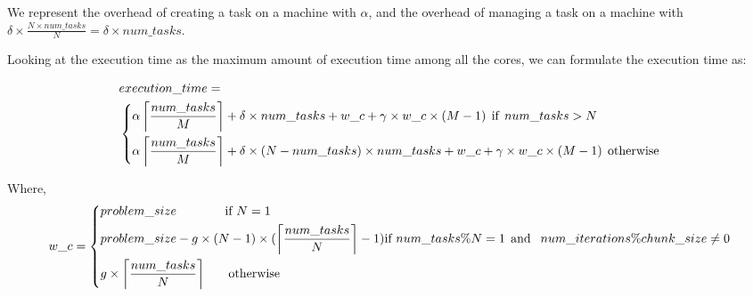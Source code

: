 We represent the overhead of creating a task on a machine with $\alpha$, and the overhead of managing a task on a machine with $\delta\times\frac{{N}\times{num\_{tasks}}}{N}=\delta\times{num\_{tasks}}$. 

Looking at the execution time as the maximum amount of execution time among all the cores, we can formulate the execution time as:  

\begin{equation}\label{formula1}
\begin{aligned}
&execution\_time = \\
&\left\{
\begin{aligned}
&
\alpha\left\lceil{\frac{num\_{tasks}}{M}}\right \rceil +\delta\times{num\_{tasks}}+{w\_c+\gamma\times{w\_c}\times{(M-1)}} \:\: \text{if\:\:}num\_{tasks}>N\\
&\alpha\left \lceil{\frac{num\_{tasks}}{M}}\right \rceil +\delta\times{(N-num\_{tasks})}\times{num\_{tasks}}+{w\_c+\gamma\times{w\_c}\times{(M-1)}} \:\: \text{otherwise}
\end{aligned}
\right.
\end{aligned}
\end{equation}


Where, 
\begin{equation}\label{formula2}
w\_c =\left\{
\begin{aligned}
&problem\_{size} \:\:\:\:\:\:\:\:\:\:\:\:\:\:\:\:        \text{ if } N=1\\
&problem\_{size}-g\times{(N-1)}\times(\left \lceil{\frac{num\_{tasks}}{N}}\right \rceil-1)
 \text{if }num\_{tasks}\%N=1\text{\:\:and\:\: }num\_{iterations}\%chunk\_{size}\neq0\\ 
&g\times\left \lceil{\frac{num\_{tasks}}{N}}\right \rceil  \:\:\:\:\:\:\:\:       \text{otherwise}
\end{aligned}
\right.
\end{equation}

